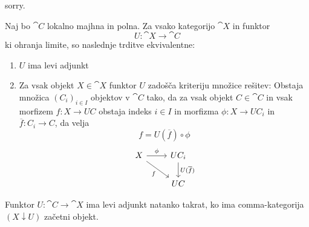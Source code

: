 \documentclass[../kategoricna_logika.tex]{subfiles}
\begin{document}
\begin{dokaz}
  sorry.
\end{dokaz}
\begin{izrek} 
Naj bo $\cat{C}$ lokalno majhna in polna. Za vsako kategorijo $\cat{X}$ in funktor 
$$U : \cat{X} \to \cat{C}$$
ki ohranja limite, so naslednje trditve ekvivalentne:
\begin{enumerate}
\item $U$ ima levi adjunkt
\item Za vsak objekt $X \in \cat{X}$ funktor $U$ zadošča kriteriju množice rešitev:
Obstaja množica $(C_i)_{i \in I}$ objektov v $\cat{C}$ tako, da za vsak objekt $C \in \cat{C}$ in vsak morfizem $f : X \to UC$ obstaja indeks $i \in I$ in morfizma $\phi : X \to UC_i$ in $\overline{f} : C_i \to C$, da velja
$$f = U(\overline{f}) \circ \phi$$
\[ \begin{tikzcd}
X \arrow[r, "\phi"] \arrow[rd, "f"'] & UC_i \arrow[d, "U(\overline{f})"] \\
& UC
\end{tikzcd} \]
\end{enumerate}
\end{izrek}
\begin{lema} \label{lema2}
Funktor $U : \cat{C} \to \cat{X}$ ima levi adjunkt natanko takrat, ko ima comma-kategorija $(X \downarrow U)$ začetni objekt.
\end{lema}
\end{document}
